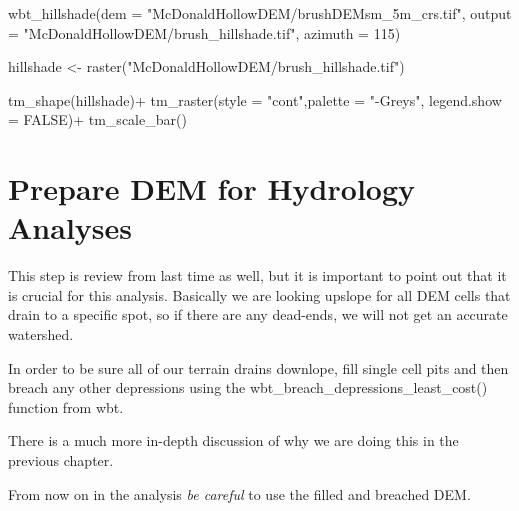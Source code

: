\documentclass[
]{book}
\newenvironment{Shaded}{\begin{snugshade}}{\end{snugshade}}
\newcommand{\AttributeTok}[1]{\textcolor[rgb]{0.77,0.63,0.00}{#1}}
\newcommand{\ConstantTok}[1]{\textcolor[rgb]{0.00,0.00,0.00}{#1}}
\newcommand{\DecValTok}[1]{\textcolor[rgb]{0.00,0.00,0.81}{#1}}
\newcommand{\FunctionTok}[1]{\textcolor[rgb]{0.00,0.00,0.00}{#1}}
\newcommand{\NormalTok}[1]{#1}
\newcommand{\OtherTok}[1]{\textcolor[rgb]{0.56,0.35,0.01}{#1}}
\newcommand{\SpecialCharTok}[1]{\textcolor[rgb]{0.00,0.00,0.00}{#1}}
\newcommand{\StringTok}[1]{\textcolor[rgb]{0.31,0.60,0.02}{#1}}
\begin{document}
\begin{Shaded}
\begin{Highlighting}[]
\FunctionTok{wbt\_hillshade}\NormalTok{(}\AttributeTok{dem =} \StringTok{"McDonaldHollowDEM/brushDEMsm\_5m\_crs.tif"}\NormalTok{,}
              \AttributeTok{output =} \StringTok{"McDonaldHollowDEM/brush\_hillshade.tif"}\NormalTok{,}
              \AttributeTok{azimuth =} \DecValTok{115}\NormalTok{)}

\NormalTok{hillshade }\OtherTok{\textless{}{-}} \FunctionTok{raster}\NormalTok{(}\StringTok{"McDonaldHollowDEM/brush\_hillshade.tif"}\NormalTok{)}

\FunctionTok{tm\_shape}\NormalTok{(hillshade)}\SpecialCharTok{+}
  \FunctionTok{tm\_raster}\NormalTok{(}\AttributeTok{style =} \StringTok{"cont"}\NormalTok{,}\AttributeTok{palette =} \StringTok{"{-}Greys"}\NormalTok{, }\AttributeTok{legend.show =} \ConstantTok{FALSE}\NormalTok{)}\SpecialCharTok{+}
  \FunctionTok{tm\_scale\_bar}\NormalTok{()}
\end{Highlighting}
\end{Shaded}

\hypertarget{prepare-dem-for-hydrology-analyses-1}{%
\section{Prepare DEM for Hydrology Analyses}\label{prepare-dem-for-hydrology-analyses-1}}

This step is review from last time as well, but it is important to point out that it is crucial for this analysis. Basically we are looking upslope for all DEM cells that drain to a specific spot, so if there are any dead-ends, we will not get an accurate watershed.

In order to be sure all of our terrain drains downlope, fill single cell pits and then breach any other depressions using the wbt\_breach\_depressions\_least\_cost() function from wbt.

There is a much more in-depth discussion of why we are doing this in the previous chapter.

From now on in the analysis \emph{be careful} to use the filled and breached DEM.
\end{document}
